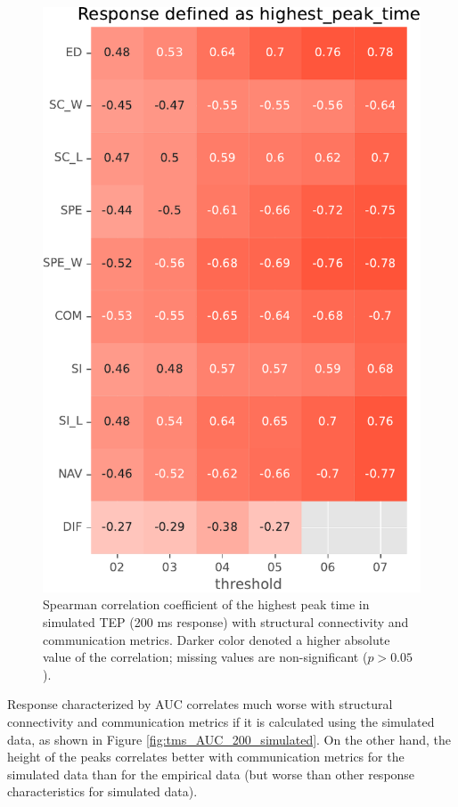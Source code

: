 \begin{figure}
    \centering
    \includegraphics[height=\textwidth]{images/nootebook_generated/pytepfit_results/simulated/200/not_over_threshold_nan/Response defined as highest_peak_time.pdf}
    \caption[TEPs highest peak time (200 ms) correlations (simulated data)]{Spearman correlation coefficient of the highest peak time in simulated TEP (200 ms response) with structural connectivity and communication metrics. Darker color denoted a higher absolute value of the correlation; missing values are non-significant ($p>0.05$).}
    \label{fig:tms_highest_time_200_simulated}
\end{figure}

Response characterized by AUC correlates much worse with structural connectivity and communication metrics if it is calculated using the simulated data, as shown in Figure \ref{fig:tms_AUC_200_simulated}. On the other hand, the height of the peaks correlates better with communication metrics for the simulated data than for the empirical data (but worse than other response characteristics for simulated data). 

